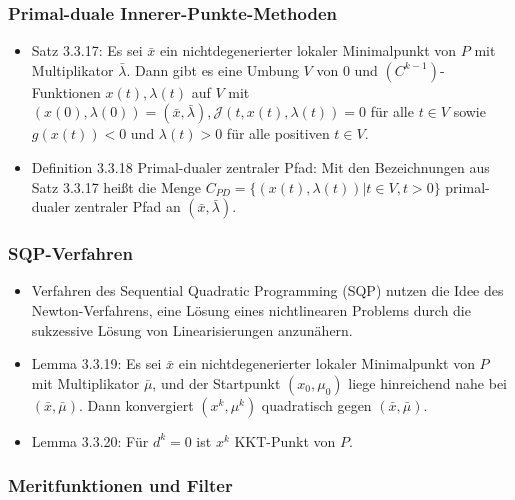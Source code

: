 \documentclass[paper=a4, fontsize=11pt]{scrartcl} %
\numberwithin{equation}{section} %
\numberwithin{figure}{section} %
\numberwithin{table}{section} %
\begin{document}
\subsubsection{Primal-duale Innerer-Punkte-Methoden}

\begin{itemize}
  \item Satz 3.3.17: Es sei $\bar{x}$ ein nichtdegenerierter lokaler Minimalpunkt von $P$ mit Multiplikator $\bar{\lambda}$. Dann gibt es eine Umbung $V$ von $0$ und $(C^{k-1})$-Funktionen $x(t), \lambda(t)$ auf $V$ mit $(x(0),\lambda(0)) = (\bar{x},\bar{\lambda}), \mathcal{J}(t,x(t),\lambda(t)) = 0$ für alle $t \in V$ sowie $g(x(t)) < 0$ und $\lambda(t) > 0$ für alle positiven $t \in V$.
  \item Definition 3.3.18 Primal-dualer zentraler Pfad: Mit den Bezeichnungen aus Satz 3.3.17 heißt die Menge $C_{PD} = \{ (x(t),\lambda(t))|t \in V, t > 0 \}$ primal-dualer zentraler Pfad an $(\bar{x},\bar{\lambda})$.
\end{itemize}

\subsubsection{SQP-Verfahren}

\begin{itemize}
  \item Verfahren des Sequential Quadratic Programming (SQP) nutzen die Idee des Newton-Verfahrens, eine Lösung eines nichtlinearen Problems durch die sukzessive Lösung von Linearisierungen anzunähern.
  \item Lemma 3.3.19: Es sei $\bar{x}$ ein nichtdegenerierter lokaler Minimalpunkt von $P$ mit Multiplikator $\bar{\mu}$, und der Startpunkt $(x_0,\mu_0)$ liege hinreichend nahe bei $(\bar{x},\bar{\mu})$. Dann konvergiert $(x^k,\mu^k)$ quadratisch gegen $(\bar{x},\bar{\mu})$.
  \item Lemma 3.3.20: Für $d^k = 0$ ist $x^k$ KKT-Punkt von $P$.
\end{itemize}

\subsubsection{Meritfunktionen und Filter}
\end{document}
